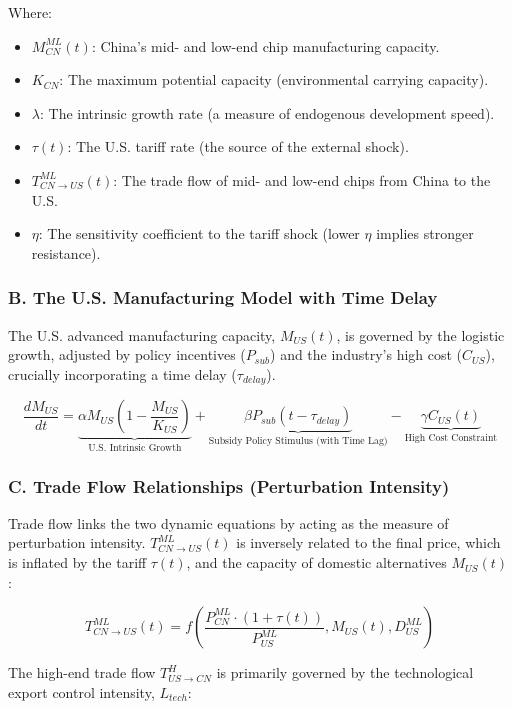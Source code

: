 \documentclass{apmcmthesis}
\begin{document}
Where:
\begin{itemize}
    \item $M_{CN}^{ML}(t)$: China's mid- and low-end chip manufacturing capacity.
    \item $K_{CN}$: The maximum potential capacity (environmental carrying capacity).
    \item $\lambda$: The intrinsic growth rate (a measure of endogenous development speed).
    \item $\tau(t)$: The U.S. tariff rate (the source of the external shock).
    \item $T_{CN \to US}^{ML}(t)$: The trade flow of mid- and low-end chips from China to the U.S.
    \item $\eta$: The sensitivity coefficient to the tariff shock (lower $\eta$ implies stronger resistance).
\end{itemize}

\subsubsection{B. The U.S. Manufacturing Model with Time Delay}

The U.S. advanced manufacturing capacity, $M_{US}(t)$, is governed by the logistic growth, adjusted by policy incentives ($P_{sub}$) and the industry's high cost ($C_{US}$), crucially incorporating a time delay ($\tau_{delay}$).

$$
\frac{dM_{US}}{dt} = \underbrace{\alpha M_{US} \left(1 - \frac{M_{US}}{K_{US}}\right)}_{\text{U.S. Intrinsic Growth}} + \underbrace{\beta P_{sub}(t - \tau_{delay})}_{\text{Subsidy Policy Stimulus (with Time Lag)}} - \underbrace{\gamma C_{US}(t)}_{\text{High Cost Constraint}}
$$

\subsubsection{C. Trade Flow Relationships (Perturbation Intensity)}

Trade flow links the two dynamic equations by acting as the measure of perturbation intensity. $T_{CN \to US}^{ML}(t)$ is inversely related to the final price, which is inflated by the tariff $\tau(t)$, and the capacity of domestic alternatives $M_{US}(t)$:

$$
T_{CN \to US}^{ML}(t) = f\left(\frac{P_{CN}^{ML} \cdot (1+\tau(t))}{P_{US}^{ML}} , M_{US}(t), D_{US}^{ML}\right)
$$

The high-end trade flow $T_{US \to CN}^{H}$ is primarily governed by the technological export control intensity, $L_{tech}$:
\end{document}
